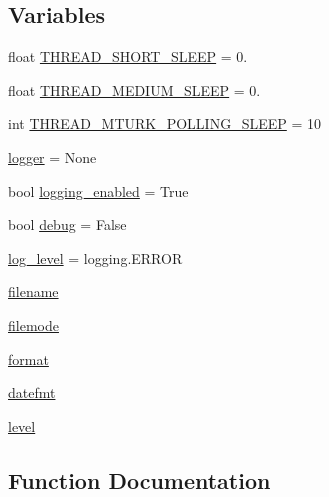 \subsection*{Variables}
\begin{DoxyCompactItemize}
\item 
float \hyperlink{namespaceparlai_1_1mturk_1_1core_1_1shared__utils_a6392f437ce11f241a6a90b1561768d12}{T\+H\+R\+E\+A\+D\+\_\+\+S\+H\+O\+R\+T\+\_\+\+S\+L\+E\+EP} = 0.
\item 
float \hyperlink{namespaceparlai_1_1mturk_1_1core_1_1shared__utils_af68ac5ae174947c440de1d14f949d3e4}{T\+H\+R\+E\+A\+D\+\_\+\+M\+E\+D\+I\+U\+M\+\_\+\+S\+L\+E\+EP} = 0.
\item 
int \hyperlink{namespaceparlai_1_1mturk_1_1core_1_1shared__utils_a0a7a6271805aa83110d8294c1eb2ea0c}{T\+H\+R\+E\+A\+D\+\_\+\+M\+T\+U\+R\+K\+\_\+\+P\+O\+L\+L\+I\+N\+G\+\_\+\+S\+L\+E\+EP} = 10
\item 
\hyperlink{namespaceparlai_1_1mturk_1_1core_1_1shared__utils_a9945e46c8b0125a6c14c9688b812cd85}{logger} = None
\item 
bool \hyperlink{namespaceparlai_1_1mturk_1_1core_1_1shared__utils_a9832bc0760523f29320bef9c6830e151}{logging\+\_\+enabled} = True
\item 
bool \hyperlink{namespaceparlai_1_1mturk_1_1core_1_1shared__utils_ad0b44e73b48649f819ffc77df873f0c1}{debug} = False
\item 
\hyperlink{namespaceparlai_1_1mturk_1_1core_1_1shared__utils_a76a224b8a80143e5007bacfb37d274cf}{log\+\_\+level} = logging.\+E\+R\+R\+OR
\item 
\hyperlink{namespaceparlai_1_1mturk_1_1core_1_1shared__utils_a225147846e08182cda53a8c7c8f17f29}{filename}
\item 
\hyperlink{namespaceparlai_1_1mturk_1_1core_1_1shared__utils_a090ef69b3303dfb77637c4fe223d55ba}{filemode}
\item 
\hyperlink{namespaceparlai_1_1mturk_1_1core_1_1shared__utils_afcac728e96b38bbad8cde6f7be4f613e}{format}
\item 
\hyperlink{namespaceparlai_1_1mturk_1_1core_1_1shared__utils_a7e58ecc6c00699f80a6d7c7c500750b1}{datefmt}
\item 
\hyperlink{namespaceparlai_1_1mturk_1_1core_1_1shared__utils_abeee033e57a3bd47f1345c1ce2f73cf9}{level}
\end{DoxyCompactItemize}


\subsection{Function Documentation}
\mbox{\label{namespaceparlai_1_1mturk_1_1core_1_1shared__utils_ac9c2cb4e45eb5bb480df0cd8b18c64da}} 
